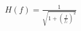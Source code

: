 \documentclass[preview]{standalone}
\begin{document}
\begin{align*}
H(f) = \frac{1}{\sqrt{1 + \left(\frac{f}{f_c}\right)^2}}
\end{align*}
\end{document}
